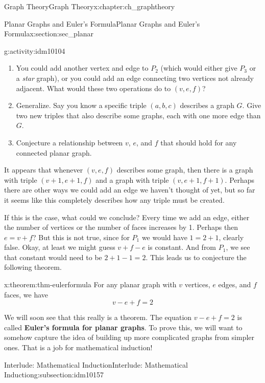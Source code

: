 \documentclass[oneside,10pt,]{book}
\newcommand{\terminology}[1]{\textbf{#1}}
\numberwithin{equation}{chapter}
\begin{document}
\begin{chapterptx}{Graph Theory}{}{Graph Theory}{}{}{x:chapter:ch_graphtheory}
\begin{sectionptx}{Planar Graphs and Euler's Formula}{}{Planar Graphs and Euler's Formula}{}{}{x:section:sec_planar}
\begin{introduction}{}
\begin{activity}{}{g:activity:idm10104}
\begin{enumerate}[font=\bfseries,label=(\alph*),ref=\alph*]
\item{}You could add another vertex and edge to \(P_2\) (which would either give \(P_3\) or a \emph{star} graph), or you could add an edge connecting two vertices not already adjacent.  What would these two operations do to \((v,e,f)\)?%
\item{}Generalize.  Say you know a specific triple \((a,b,c)\) describes a graph \(G\).  Give two new triples that also describe some graphs, each with one more edge than \(G\).%
\item{}Conjecture a relationship between \(v\), \(e\), and \(f\) that should hold for any connected planar graph.%
\end{enumerate}
\end{activity}
It appears that whenever \((v,e,f)\) describes some graph, then there is a graph with triple \((v+1, e+1, f)\) and a graph with triple \((v,e+1, f+1)\).  Perhaps there are other ways we could add an edge we haven't thought of yet, but so far it seems like this completely describes how any triple must be created.%
\par
If this is the case, what could we conclude?  Every time we add an edge, either the number of vertices or the number of faces increases by 1.  Perhaps then \(e = v + f\)?  But this is not true, since for \(P_1\) we would have \(1 = 2 + 1\), clearly false.  Okay, at least we might guess \(v + f - e\) is constant.  And from \(P_1\), we see that constant would need to be \(2 + 1 - 1 = 2\).  This leads us to conjecture the following theorem.%
\begin{theorem}{}{}{x:theorem:thm-eulerformula}%
For any planar graph with \(v\) vertices, \(e\) edges, and \(f\) faces, we have%
\begin{equation*}
v - e + f = 2
\end{equation*}
%
\end{theorem}
We will soon see that this really is a theorem.  The equation \(v-e+f = 2\) is called \terminology{Euler's formula for planar graphs}.  To prove this, we will want to somehow capture the idea of building up more complicated graphs from simpler ones.  That is a job for mathematical induction!%
\end{introduction}%
%
%
\typeout{************************************************}
\typeout{************************************************}
%
\begin{subsectionptx}{Interlude: Mathematical Induction}{}{Interlude: Mathematical Induction}{}{}{g:subsection:idm10157}

\end{subsectionptx}
\end{sectionptx}
\end{chapterptx}
\end{document}

